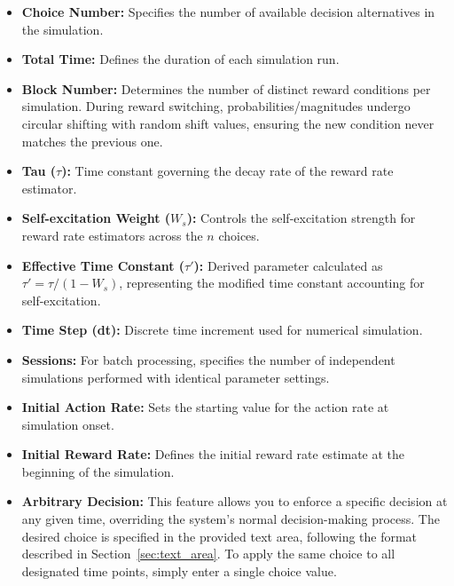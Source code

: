 \begin{itemize}
    \item \textbf{Choice Number:} Specifies the number of available decision alternatives in the simulation.
    
    \item \textbf{Total Time:} Defines the duration of each simulation run.
    
    \item \textbf{Block Number:} Determines the number of distinct reward conditions per simulation. During reward switching, probabilities/magnitudes undergo circular shifting with random shift values, ensuring the new condition never matches the previous one.
    
    \item \textbf{Tau ($\tau$):} Time constant governing the decay rate of the reward rate estimator.
    
    \item \textbf{Self-excitation Weight ($W_s$):} Controls the self-excitation strength for reward rate estimators across the $n$ choices.
    
    \item \textbf{Effective Time Constant ($\tau'$):} Derived parameter calculated as $\tau' = \tau/(1-W_s)$, representing the modified time constant accounting for self-excitation.
    
    \item \textbf{Time Step (dt):} Discrete time increment used for numerical simulation.
    
    \item \textbf{Sessions:} For batch processing, specifies the number of independent simulations performed with identical parameter settings.
    
    \item \textbf{Initial Action Rate:} Sets the starting value for the action rate at simulation onset.
    
    \item \textbf{Initial Reward Rate:} Defines the initial reward rate estimate at the beginning of the simulation.
    
    \item \textbf{Arbitrary Decision:}​​ This feature allows you to enforce a specific decision at any given time, overriding the system's normal decision-making process. The desired choice is specified in the provided text area, following the format described in Section~\ref{sec:text_area}. To apply the same choice to all designated time points, simply enter a single choice value.
\end{itemize}

